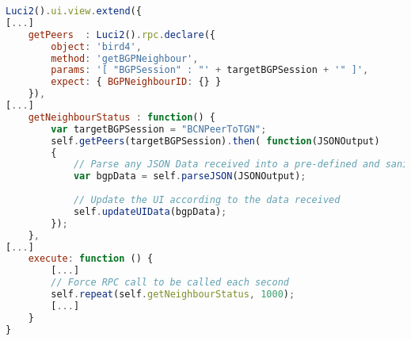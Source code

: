 \begin{lstlisting}[language=javascript,label={lst:luci2rpc},caption={RPC Call Script.}]
Luci2().ui.view.extend({
[...]
    getPeers  : Luci2().rpc.declare({
        object: 'bird4',
        method: 'getBGPNeighbour',
        params: '[ "BGPSession" : "' + targetBGPSession + '" ]',
        expect: { BGPNeighbourID: {} }
    }),
[...]
    getNeighbourStatus : function() {
        var targetBGPSession = "BCNPeerToTGN";
        self.getPeers(targetBGPSession).then( function(JSONOutput)
        {
            // Parse any JSON Data received into a pre-defined and sanitised format
            var bgpData = self.parseJSON(JSONOutput);
    
            // Update the UI according to the data received
            self.updateUIData(bgpData);
        });
    },
[...]
    execute: function () {
        [...]
        // Force RPC call to be called each second
        self.repeat(self.getNeighbourStatus, 1000);
        [...]
    }
}
\end{lstlisting}